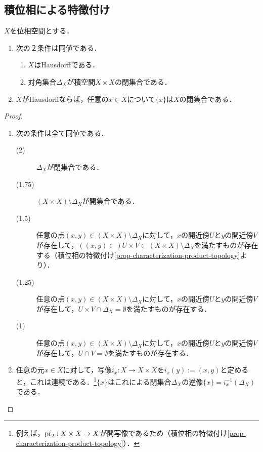 \documentclass[uplatex,dvipdfmx]{jsreport}
\begin{document}
\subsection{積位相による特徴付け}

\begin{proposition}\label{prop-characterization-Hausdorff}
    $X$を位相空間とする．
    \begin{enumerate}
        \item 次の２条件は同値である．
        \begin{enumerate}[(1)]
            \item $X$はHausdorffである．
            \item 対角集合$\Delta_X$が積空間$X\times X$の閉集合である．
        \end{enumerate}
        \item $X$がHausdorffならば，任意の$x\in X$について$\{x\}$は$X$の閉集合である．
    \end{enumerate}
\end{proposition}
\begin{proof}\mbox{}
    \begin{enumerate}
        \item 次の条件は全て同値である．
        \begin{description}
            \item[(2)] $\Delta_X$が閉集合である．
            \item[(1.75)] $(X\times X)\setminus\Delta_X$が開集合である．
            \item[(1.5)] 任意の点$(x,y)\in(X\times X)\setminus\Delta_X$に対して，$x$の開近傍$U$と$y$の開近傍$V$が存在して，$((x,y)\in )U\times V\subset (X\times X)\setminus\Delta_X$を満たすものが存在する（積位相の特徴付け\ref{prop-characterization-product-topology}より）．
            \item[(1.25)] 任意の点$(x,y)\in(X\times X)\setminus\Delta_X$に対して，$x$の開近傍$U$と$y$の開近傍$V$が存在して，$U\times V\cap\Delta_X=\emptyset$を満たすものが存在する．
            \item[(1)] 任意の点$(x,y)\in(X\times X)\setminus\Delta_X$に対して，$x$の開近傍$U$と$y$の開近傍$V$が存在して，$U\cap V=\emptyset$を満たすものが存在する．
        \end{description}
        \item 任意の元$x\in X$に対して，写像$i_x:X\to X\times X$を$i_x(y):=(x,y)$と定めると，これは連続である．\footnote{例えば，$\mathrm{pr}_2:X\times X\to X$が開写像であるため（積位相の特徴付け\ref{prop-characterization-product-topology}）．}$\{x\}$はこれによる閉集合$\Delta_X$の逆像$\{x\}=i^{-1}_x(\Delta_X)$である．
    \end{enumerate}
\end{proof}
\end{document}
